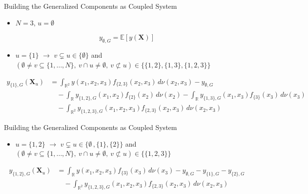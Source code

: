 \begin{frame}{Building the Generalized Components as Coupled System}
    \begin{itemize}
    \item $N = 3$, $u = \emptyset$
  \end{itemize}
    \begin{equation*}
    y_{\emptyset,G} = \mathbb{E}[y(\boldsymbol{X})]
    \end{equation*}
    \begin{itemize}
      \item \textcolor{pastelRedDark}{$u = \{1\}$ $\rightarrow$ $v \subsetneq u \in \{\emptyset\}$} and \textcolor{pastelBlueDark}{$(\emptyset \ne v \subseteq \{1,\dots,N\},\ v \cap u \ne \emptyset,\ v \not\subset u) \in \{\{1,2\}, \{1,3\}, \{1,2,3\}\}$}
    \end{itemize}
    \begin{align*}
       y_{{\{1\}},G}(\boldsymbol{X}_u) &= \int_{\mathbb{R}^{2}} y(x_1, x_2, x_3) f_{{\{2, 3\}}}(x_2, x_3) \, d \nu(x_2, x_3) - y_{\emptyset,G} \\[1em]
    &\quad - \int_{\mathbb{R}}y_{{\{1, 2\}}, G}(x_1, x_2)f_{{\{2\}}}(x_2) \, d \nu(x_2) - \int_{\mathbb{R}}y_{{\{1, 3\}}, G}(x_1, x_3)f_{{\{3\}}}(x_3) \, d \nu(x_3) \\[1em]
    &\quad - \int_{\mathbb{R}^2}y_{{\{1, 2, 3\}}, G}(x_1, x_2, x_3)f_{{\{2, 3\}}}(x_2, x_3) \, d \nu(x_2, x_3)
    \end{align*}
\end{frame}


\begin{frame}{Building the Generalized Components as Coupled System}
      \begin{itemize}
      \item \textcolor{pastelRedDark}{$u = \{1, 2\}$ $\rightarrow$ $v \subsetneq u \in \{\emptyset\,, \{1\}, \{2\}\}$} and \textcolor{pastelBlueDark}{$(\emptyset \ne v \subseteq \{1,\dots,N\},\ v \cap u \ne \emptyset,\ v \not\subset u) \in \{\{1,2,3\}\}$}
    \end{itemize}
    \begin{align*}
       y_{{\{1, 2\}},G}(\boldsymbol{X}_u) &= \int_{\mathbb{R}} y(x_1, x_2, x_3) f_{{\{3\}}}(x_3) \, d \nu(x_3) - y_{\emptyset,G} - y_{{\{1\}},G} - y_{{\{2\}},G}\\[1em]
    &\quad - \int_{\mathbb{R}^2}y_{{\{1, 2, 3\}}, G}(x_1, x_2, x_3)f_{{\{2, 3\}}}(x_2, x_3) \, d \nu(x_2, x_3)
    \end{align*}
\end{frame}



